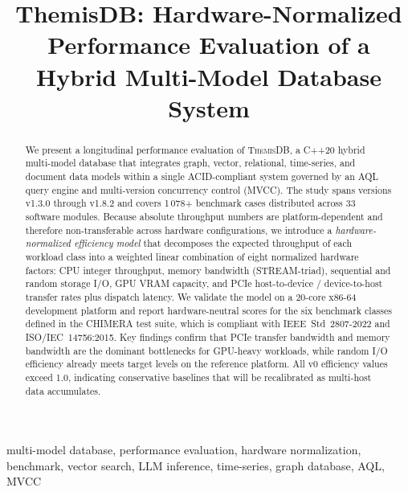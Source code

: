 \documentclass[conference]{IEEEtran}
\newcommand{\themis}{\textsc{ThemisDB}}
\begin{document}
\title{ThemisDB: Hardware-Normalized Performance Evaluation of a
       Hybrid Multi-Model Database System}

\author{%
}

\maketitle

\begin{abstract}
We present a longitudinal performance evaluation of \themis{}, a
C++20 hybrid multi-model database that integrates graph, vector,
relational, time-series, and document data models within a single
ACID-compliant system governed by an AQL query engine and
multi-version concurrency control (MVCC).
The study spans versions v1.3.0 through v1.8.2 and covers
1\,078+ benchmark cases distributed across 33 software modules.
Because absolute throughput numbers are platform-dependent and
therefore non-transferable across hardware configurations, we
introduce a \emph{hardware-normalized efficiency model} that
decomposes the expected throughput of each workload class into a
weighted linear combination of eight normalized hardware factors:
CPU integer throughput, memory bandwidth (STREAM-triad), sequential
and random storage I/O, GPU VRAM capacity, and PCIe host-to-device /
device-to-host transfer rates plus dispatch latency.
We validate the model on a 20-core x86-64 development platform and
report hardware-neutral scores for the six benchmark classes defined
in the CHIMERA test suite, which is compliant with IEEE~Std~2807-2022
and ISO/IEC~14756:2015.
Key findings confirm that PCIe transfer bandwidth and memory bandwidth
are the dominant bottlenecks for GPU-heavy workloads, while random
I/O efficiency already meets target levels on the reference platform.
All v0 efficiency values exceed 1.0, indicating conservative
baselines that will be recalibrated as multi-host data accumulates.
\end{abstract}

\begin{IEEEkeywords}
multi-model database, performance evaluation, hardware normalization,
benchmark, vector search, LLM inference, time-series, graph database,
AQL, MVCC
\end{IEEEkeywords}
\end{document}
